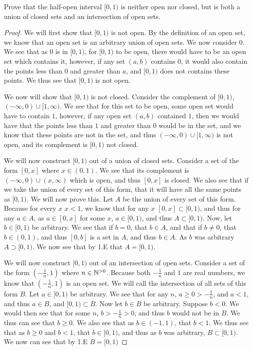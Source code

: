 \begin{minorEx} %
  Prove that the half-open interval $[0,1)$  is neither open nor
  closed, but is both a union of closed sets and an intersection of
  open sets.
\end{minorEx}
\begin{proof}
  We will first show that $[0,1)$ is not open. By the definition of an
  open set, we know that an open set is an arbitrary union of open
  sets. We now consider $0$. We see
  that as $0$ is in $[0,1)$, for $[0,1)$ to be open, there would have
  to be an open set which contains it, however, if any set $(a,b)$
  contains $0$, it would also contain the points less than $0$ and
  greater than $a$, and $[0,1)$ does not contains these points. We
  thus see that $[0,1)$ is not open. 
  
  We now will show that $[0,1)$ is
  not closed. Consider the complement of
  $[0,1)$, $(-\infty,0)\cup [1,\infty)$. We see that for this set to
  be open, some open set would have to contain $1$, however, if any
  open set $(a,b)$ contained $1$, then we would have that the points
  less than $1$ and greater than $0$ would be in the set, and we know
  that these points are not in the set, and thus $(-\infty,0)\cup
  [1,\infty)$ is not open, and its complement is $[0,1)$ not closed.

  We will now construct $[0,1)$ out of a union of closed
  sets. Consider a set of the form $[0,x]$ where $x\in (0,1)$. We see
  that its complement is $(-\infty,0) \cup (x,\infty)$ which is open,
  and thus $[0,x]$ is closed. We also see that if we take the union of
  every set of this form, that it will have all the same points as
  $[0,1)$. We will now prove this. Let $A$ be the union of every set of
  this form. Because for every $x$ $x<1$, we know that for any $x$ 
  $[0,x] \subset [0,1)$, and thus for any $a \in A$, as $a\in [0,x]$
  for some $x$, $a\in [0,1)$, and thus $A\subset [0,1)$. Now, let 
  $b \in [0,1)$ be arbitrary. We see that if $b=0$, that $b\in A$, and
  that if $b\neq 0$, that $b\in (0,1)$, and thus $[0,b]$ is a set in
  $A$, and thus $b\in A$. As $b$ was arbitrary $A\supset [0,1)$. We
  now see that by 1.E that $A = [0,1)$.

  We will now construct $[0,1)$ out of an intersection of open
  sets. Consider a set of the form $(-\frac{1}{n}, 1)$ where $n\in
  \mathbb{N}^{>0}$. Because both $-\frac{1}{n}$ and $1$ are real numbers, we know
  that $(-\frac{1}{n}, 1)$ is an open set. We will call the
  intersection of all sets of this form $B$. Let $a \in [0,1)$ be
  arbitrary. We see that for any $n$, $a\geq 0> -\frac{1}{n}$, and
  $a<1$, and thus $a\in B$, and $[0,1)\subset B$. Now let $b\in B$ be
  arbitrary. Suppose $b <0$. We would then see that for some $n$, 
  $b>-\frac{1}{n}>0$, and thus $b$ would not be in $B$. We thus can
  see that $b\geq 0$. We also see that as $b\in (-1,1)$, that $b<1$.
  We thus see that as $b\geq 0$ and $b<1$, that $b \in [0,1)$, and
  thus as $b$ was arbitrary, $B\subset [0,1)$. We now can see that by
  1.E $B=[0,1)$
\end{proof}

